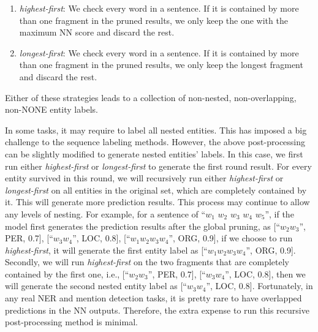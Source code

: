 \documentclass[11pt,a4paper]{article}
\begin{document}
\begin{enumerate}
	\item {\it highest-first}: We check every word in a sentence. If it is contained by more than one fragment in the pruned results, we only keep the one with the maximum NN score and discard the rest. 
	\item {\it longest-first}: We check every word in a sentence. If it is contained by more than one fragment in the pruned results, we only keep the longest fragment and discard the rest. 
\end{enumerate}

Either of these strategies leads to a collection of non-nested, non-overlapping, non-NONE entity labels.

In some tasks, it may  require to label all nested entities. This has imposed a big challenge to the sequence labeling methods. However, the above post-processing can be slightly modified to generate nested entities' labels. In this case, we first run either {\it highest-first} or {\it longest-first} to generate the first round result. For every entity survived in this round, we will recursively run either {\it highest-first} or {\it longest-first} on all entities in the original set, which are completely contained by it. This will generate more prediction results. This process may continue to allow any levels of nesting. For example, for a sentence of ``$w_1$  $w_2$ $w_3$ $w_4$ $w_5$'', 
if the model first generates the prediction results  after the global pruning, as  [``$w_2 w_3$'', PER, 0.7], [``$w_3 w_4$'', LOC, 0.8], [``$w_1 w_2 w_3 w_4$'', ORG, 0.9], if we choose to run {\it highest-first}, it will generate the first entity label as [``$w_1 w_2 w_3 w_4$'', ORG, 0.9]. Secondly, we will run {\it highest-first} on the two fragments that are completely contained by the first one, i.e.,  [``$w_2 w_3$'', PER, 0.7], [``$w_3 w_4$'', LOC, 0.8], then we will generate the second nested entity label as [``$w_3 w_4$'', LOC, 0.8].
Fortunately, in any real NER and mention detection tasks, it is pretty rare to have overlapped predictions in the NN outputs. Therefore, the extra expense to run this recursive post-processing method is minimal. 
\end{document}
